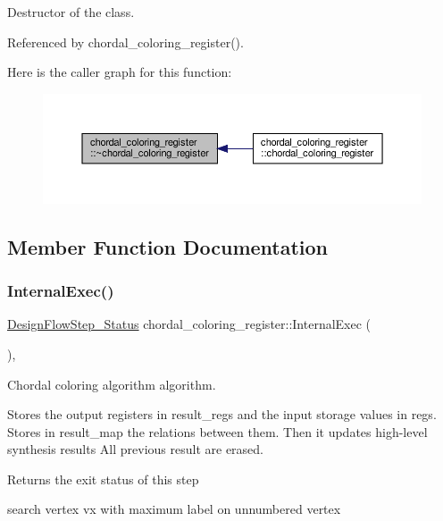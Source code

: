 Destructor of the class. 



Referenced by chordal\+\_\+coloring\+\_\+register().

Here is the caller graph for this function\+:
\nopagebreak
\begin{figure}[H]
\begin{center}
\leavevmode
\includegraphics[width=350pt]{d9/db4/classchordal__coloring__register_a4c3218f3284d36d62e021f3f57c1e53f_icgraph}
\end{center}
\end{figure}


\subsection{Member Function Documentation}
\mbox{\label{classchordal__coloring__register_a28bdde20568880c6b074dcff39d0bf83}} 
\subsubsection{\texorpdfstring{Internal\+Exec()}{InternalExec()}}
{\footnotesize\ttfamily \hyperlink{design__flow__step_8hpp_afb1f0d73069c26076b8d31dbc8ebecdf}{Design\+Flow\+Step\+\_\+\+Status} chordal\+\_\+coloring\+\_\+register\+::\+Internal\+Exec (\begin{DoxyParamCaption}{ }\end{DoxyParamCaption})\hspace{0.3cm}{\ttfamily [override]}, {\ttfamily [virtual]}}



Chordal coloring algorithm algorithm. 

Stores the output registers in result\+\_\+regs and the input storage values in regs. Stores in result\+\_\+map the relations between them. Then it updates high-\/level synthesis results All previous result are erased. \begin{DoxyReturn}{Returns}
the exit status of this step 
\end{DoxyReturn}
search vertex vx with maximum label on unnumbered vertex

